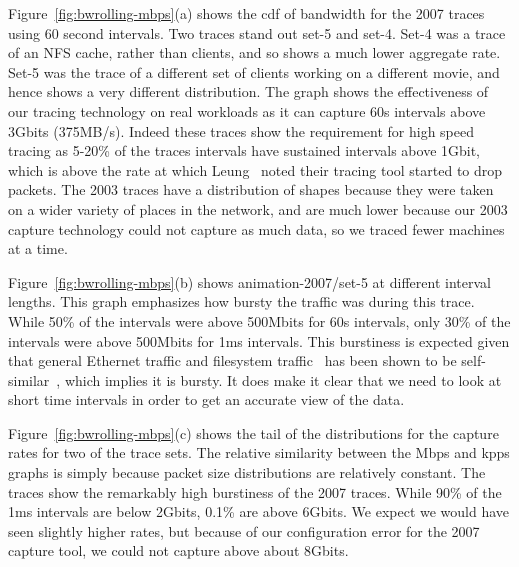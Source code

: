 Figure~\ref{fig:bwrolling-mbps}(a) shows the cdf of bandwidth for the
2007 traces using 60 second intervals.  Two traces stand out set-5 and
set-4.  Set-4 was a trace of an NFS cache, rather than clients, and so
shows a much lower aggregate rate.  Set-5 was the trace of a different
set of clients working on a different movie, and hence shows a very
different distribution.  The graph shows the effectiveness of our
tracing technology on real workloads as it can capture 60s intervals
above 3Gbits (375MB/s).  Indeed these traces show the requirement for
high speed tracing as 5-20\% of the traces intervals have sustained
intervals above 1Gbit, which is above the rate at which
Leung~\cite{LeungUsenix08} noted their tracing tool started to drop
packets.  The 2003 traces have a distribution of shapes because they
were taken on a wider variety of places in the network, and are much
lower because our 2003 capture technology could not capture as much
data, so we traced fewer machines at a time.

Figure~\ref{fig:bwrolling-mbps}(b) shows animation-2007/set-5 at different
interval lengths.  This graph emphasizes how bursty the traffic was
during this trace. While 50\% of the intervals were above 500Mbits for
60s intervals, only 30\% of the intervals were above 500Mbits for 1ms
intervals.  This burstiness is expected given that
general Ethernet traffic and filesystem
traffic~\cite{Gribble98selfsimilar} has been shown to be
self-similar~\cite{Leland94selfsimilar}, which implies it is bursty.
It does make it clear that we need to look at short time intervals in
order to get an accurate view of the data.

Figure~\ref{fig:bwrolling-mbps}(c) shows the tail of the distributions for
the capture rates for two of the trace sets.  The relative similarity
between the Mbps and kpps graphs is simply because packet size
distributions are relatively constant.  The traces show the remarkably high
burstiness of the 2007 traces.  While 90\% of the 1ms intervals are
below 2Gbits, 0.1\% are above 6Gbits.  We expect we would have seen
slightly higher rates, but because of our configuration error for the
2007 capture tool, we could not capture above about 8Gbits.


\begin{figure*}
\caption{Bandwidth measured in the collection process.  In figure (b),
animation-2007/set-5 at different intervals is the top group of 4 lines, and
animation-2003/set-12 is the bottom group of 4 lines. animation-2003/set-12 does not go
all the way to the right at 60s intervals because there were
insufficient data points for the 0.9999 quantile.}
\label{fig:bwrolling-mbps}
\end{figure*}

